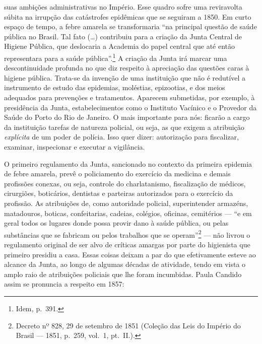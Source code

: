 suas ambições administrativas no Império. Esse quadro sofre uma
reviravolta súbita na irrupção das catástrofes epidêmicas que se
seguiram a 1850. Em curto espaço de tempo, a febre amarela se
transformaria ``na principal questão de saúde pública no Brasil. Tal
fato (\ldots{}) contribuiu para a criação da Junta Central de Higiene
Pública, que deslocaria a Academia do papel central que até então
representara para a saúde pública''.\footnote{Idem\textit{,} p.~391.} A
criação da Junta irá marcar uma descontinuidade profunda no que diz
respeito à apreciação das questões caras à higiene pública. Trata-se da
invenção de uma instituição que não é redutível a instrumento de estudo
das epidemias, moléstias, epizootias, e dos meios adequados para
prevenções e tratamentos. Aparecem submetidas, por exemplo, à
presidência da Junta, estabelecimentos como o Instituto Vacínico e o
Provedor da Saúde do Porto do Rio de Janeiro. O mais importante para
nós: ficarão a cargo da instituição tarefas de natureza policial, ou
seja, as que exigem a atribuição \textit{explícita} de um poder de
polícia. Isso quer dizer: autorização para fiscalizar, examinar,
inspecionar e executar a vigilância.

O primeiro regulamento da Junta, sancionado no contexto da primeira
epidemia de febre amarela, prevê o policiamento do exercício da medicina
e demais profissões conexas, ou seja, controle do charlatanismo,
fiscalização de médicos, cirurgiões, boticários, dentistas e parteiras
autorizados para o exercício da profissão. As atribuições de, como
autoridade policial, superintender armazéns, matadouros, boticas,
confeitarias, cadeias, colégios, oficinas, cemitérios --- ``e em geral
todos os lugares donde possa provir dano à saúde pública, ou pelas
substâncias que se fabricam ou pelos trabalhos que se operam''\footnote{Decreto
  nº 828, 29 de setembro de 1851 (Coleção das Leis do Império do Brasil
  --- 1851, p.~259, vol.~1, pt.~II.).} --- não livrou o regulamento
original de ser alvo de críticas amargas por parte do higienista que
primeiro presidiu a casa. Essas coisas deixam a par do que efetivamente
esteve ao alcance da Junta, ao longo de algumas décadas de atividade,
tendo em vista o amplo raio de atribuições policiais que lhe foram
incumbidas. Paula Candido assim se pronuncia a respeito em 1857:

